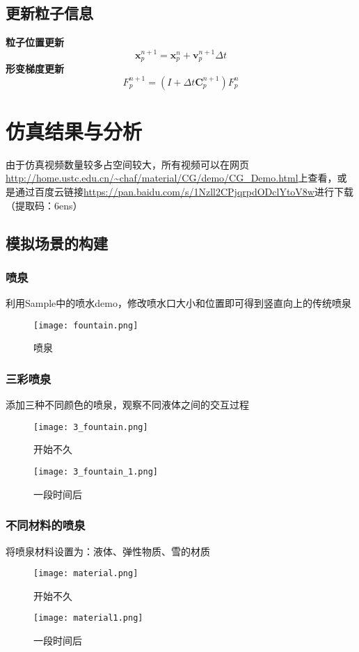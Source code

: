 \documentclass[14pt]{scrartcl} %
\begin{document}
\subsection{更新粒子信息}
\textbf{粒子位置更新}
\begin{equation}
\boldsymbol x_p^{n+1}=\boldsymbol x_p^n+\boldsymbol v_p^{n+1}\Delta t
\end{equation}
\textbf{形变梯度更新}
\begin{equation}
F_p^{n+1}=(I+\Delta t\boldsymbol C_p^{n+1})F_p^n
\end{equation}
\pagebreak
\section{仿真结果与分析}
由于仿真视频数量较多占空间较大，所有视频可以在网页\url{http://home.ustc.edu.cn/~chaf/material/CG/demo/CG_Demo.html}上查看，或是通过百度云链接\url{https://pan.baidu.com/s/1Nzll2CPjqrpdODclYtoV8w}进行下载（提取码：6ens）
\subsection{模拟场景的构建}
\subsubsection{喷泉}
利用Sample中的喷水demo，修改喷水口大小和位置即可得到竖直向上的传统喷泉

\begin{figure}[h] %
	\centering
	\texttt{[image: fountain.png]} %
	\caption{喷泉}
\end{figure}
\pagebreak
\subsubsection{三彩喷泉}
添加三种不同颜色的喷泉，观察不同液体之间的交互过程
\begin{figure}[h]
	\centering
	\texttt{[image: 3\_fountain.png]} %
	\caption{开始不久}
	
	\centering
	\texttt{[image: 3\_fountain\_1.png]} %
	\caption{一段时间后}
\end{figure}
\pagebreak
\subsubsection{不同材料的喷泉}
将喷泉材料设置为：液体、弹性物质、雪的材质
\begin{figure}[h]
	\centering
	\texttt{[image: material.png]} %
	\caption{开始不久}
	
	\centering
	\texttt{[image: material1.png]} %
	\caption{一段时间后}
\end{figure}
\end{document}
